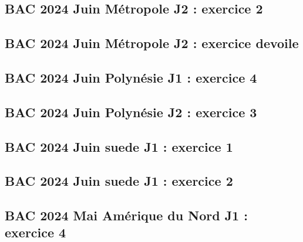 \documentclass[lang=fr,edition=teacher,layout=sheet]{mxbook}
\begin{document}
\begingroup\endgroup
\par\bigskip
{}\subsection*{BAC 2024 Juin Métropole J2 : exercice 2}
\begingroup\endgroup
\par\bigskip
{}\subsection*{BAC 2024 Juin Métropole J2 : exercice devoile}
\begingroup\endgroup
\par\bigskip
{}\subsection*{BAC 2024 Juin Polynésie J1 : exercice 4}
\begingroup\endgroup
\par\bigskip
{}\subsection*{BAC 2024 Juin Polynésie J2 : exercice 3}
\begingroup\endgroup
\par\bigskip
{}\subsection*{BAC 2024 Juin suede J1 : exercice 1}
\begingroup\endgroup
\par\bigskip
{}\subsection*{BAC 2024 Juin suede J1 : exercice 2}
\begingroup\endgroup
\par\bigskip
{}\subsection*{BAC 2024 Mai Amérique du Nord J1 : exercice 4}
\end{document}
